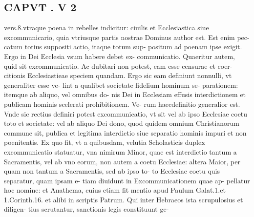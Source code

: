 \documentclass{article}
\begin{document}
\begin{pages}
\section*{CAPVT . V 2 }\pstart vers.8.vtraque poena in rebelles indicitur: ciuilis et Ecclesiastica siue excommunicario, quia vtriusque partis nostrae Dominus author est. Est enim pec- catum totius suppositi actio, itaque totum sup- positum ad poenam ipse exigit. Ergo in Dei Ecclesia vsum habere debet ex- communicatio. Quaeritur autem, quid sit excommunicatio. Ac dubitari non potest, eam esse censurae et coer- citionis Ecclesiastieae speciem quandam. Ergo sic eam definiunt nonnulli, vt generaliter esse ve- lint a qualibet societate fidelium hominum se- parationem: itemque ab aliquo, vel omnibus do- nis Dei in Ecclesiam effusis interdictionem et publicam hominis scelerati prohibitionem. Ve- rum haecdefinitio generalior est. Vnde sic rectius definiri potest excommunicatio, vt sit vel ab ipso Ecclesiae coetu toto et societate: vel ab aliquo Dei dono, quod quidem omnium Christianorum commune sit, publica et legitima interdictio siue separatio hominis impuri et non poenitentis. Ex quo fit, vt a quibusdam, velutia Scholasticis duplex excommunicatio statuatur, vna nimirum Minor, quae est interdictio tantum a Sacramentis, vel ab vno eorum, non autem a coetu Ecclesiae: altera Maior, per quam non tantum a Sacramentis, sed ab ipso to- to Ecclesiae coetu quis separatur, quam ipsam e- tiam diuidunt in Excommunicationem quae ap- pellatur hoc nomine: et Anathema, cuius etiam fit mentio apud Paulum Galat.1.et 1.Corinth.16. et alibi in scriptis Patrum. Qui inter Hebraeos ista scrupulosius et diligen- tius scrutantur, sanctionis legis constituunt ge-  \pend

\end{pages}
\end{document}

